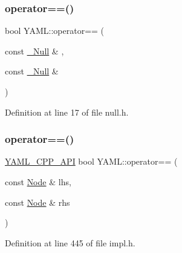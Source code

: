 \mbox{\label{namespace_y_a_m_l_a8e7a965ead80d615dd7adcc4480cf264}} 
\subsubsection{\texorpdfstring{operator==()}{operator==()}\hspace{0.1cm}{\footnotesize\ttfamily [1/2]}}
{\footnotesize\ttfamily bool Y\+A\+M\+L\+::operator== (\begin{DoxyParamCaption}\item[{const \mbox{\hyperlink{struct_y_a_m_l_1_1___null}{\+\_\+\+Null}} \&}]{,  }\item[{const \mbox{\hyperlink{struct_y_a_m_l_1_1___null}{\+\_\+\+Null}} \&}]{ }\end{DoxyParamCaption})\hspace{0.3cm}{\ttfamily [inline]}}



Definition at line 17 of file null.\+h.

\mbox{\label{namespace_y_a_m_l_a7c052a4506f887447de58aa58f6eb8fb}} 
\subsubsection{\texorpdfstring{operator==()}{operator==()}\hspace{0.1cm}{\footnotesize\ttfamily [2/2]}}
{\footnotesize\ttfamily \mbox{\hyperlink{dll_8h_a70903db05b58f40db9aa4f966658fa65}{Y\+A\+M\+L\+\_\+\+C\+P\+P\+\_\+\+A\+PI}} bool Y\+A\+M\+L\+::operator== (\begin{DoxyParamCaption}\item[{const \mbox{\hyperlink{class_y_a_m_l_1_1_node}{Node}} \&}]{lhs,  }\item[{const \mbox{\hyperlink{class_y_a_m_l_1_1_node}{Node}} \&}]{rhs }\end{DoxyParamCaption})\hspace{0.3cm}{\ttfamily [inline]}}



Definition at line 445 of file impl.\+h.

\mbox{\label{namespace_y_a_m_l_a952d789a7eee50a875acb0dd53ad60d4}} 
